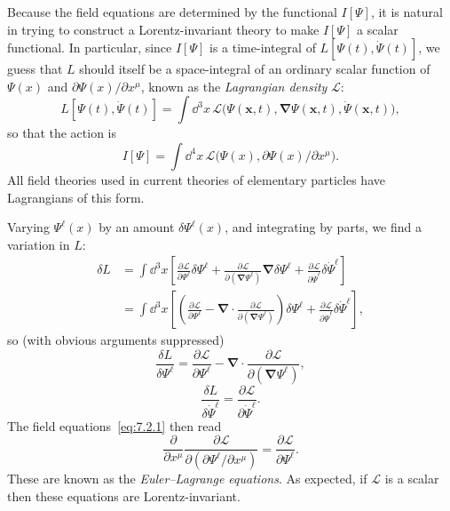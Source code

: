 Because the field equations are determined by the functional $I[\Psi]$,
it is natural in trying to construct a Lorentz-invariant theory to make
$I[\Psi]$ a scalar functional. In particular, since $I[\Psi]$ is a time-integral
of $L[\Psi(t),\dot\Psi(t)]$, we guess that $L$ should itself be a space-integral of an
ordinary scalar function of $\Psi(x)$ and $\partial\Psi(x)/\partial x^\mu$, known
as the \textit{Lagrangian density} $\mathcal{L}$:
\begin{equation}
L[\Psi(t),\dot\Psi(t)]=\int \dd^3x\,
\mathcal{L}\bigl(\Psi(\mathbf{x},t),\boldsymbol{\nabla}\Psi(\mathbf{x},t),
\dot\Psi(\mathbf{x},t)\bigr),
\tag{7.2.5}\label{eq:7.2.5}
\end{equation}
so that the action is
\begin{equation}
I[\Psi]=\int \dd^4x\,
\mathcal{L}\bigl(\Psi(x),\partial\Psi(x)/\partial x^\mu\bigr).
\tag{7.2.6}\label{eq:7.2.6}
\end{equation}
All field theories used in current theories of elementary particles have
Lagrangians of this form.

Varying $\Psi^\ell(x)$ by an amount $\delta\Psi^\ell(x)$, and integrating by parts,
we find a variation in $L$:
\begin{align*}
\delta L
&=\int \dd^3x\left[
\frac{\partial\mathcal{L}}{\partial\Psi^\ell}\delta\Psi^\ell
+\frac{\partial\mathcal{L}}{\partial(\boldsymbol{\nabla}\Psi^\ell)}
\boldsymbol{\nabla}\delta\Psi^\ell
+\frac{\partial\mathcal{L}}{\partial\dot\Psi^\ell}\delta\dot\Psi^\ell
\right]
\\
&=\int \dd^3x\left[
\left(\frac{\partial\mathcal{L}}{\partial\Psi^\ell}
-\boldsymbol{\nabla}\cdot
\frac{\partial\mathcal{L}}{\partial(\boldsymbol{\nabla}\Psi^\ell)}\right)
\delta\Psi^\ell
+\frac{\partial\mathcal{L}}{\partial\dot\Psi^\ell}\delta\dot\Psi^\ell
\right],
\end{align*}
so (with obvious arguments suppressed)
\begin{equation}
\frac{\delta L}{\delta\Psi^\ell}
=\frac{\partial\mathcal{L}}{\partial\Psi^\ell}
-\boldsymbol{\nabla}\cdot
\frac{\partial\mathcal{L}}{\partial(\boldsymbol{\nabla}\Psi^\ell)},
\tag{7.2.7}\label{eq:7.2.7}
\end{equation}
\begin{equation}
\frac{\delta L}{\delta\dot\Psi^\ell}
=\frac{\partial\mathcal{L}}{\partial\dot\Psi^\ell}.
\tag{7.2.8}\label{eq:7.2.8}
\end{equation}
The field equations~\eqref{eq:7.2.1} then read
\begin{equation}
\frac{\partial}{\partial x^\mu}
\frac{\partial\mathcal{L}}{\partial(\partial\Psi^\ell/\partial x^\mu)}
=\frac{\partial\mathcal{L}}{\partial\Psi^\ell}.
\tag{7.2.9}\label{eq:7.2.9}
\end{equation}
These are known as the \textit{Euler--Lagrange equations}. As expected, if
$\mathcal{L}$ is a scalar then these equations are Lorentz-invariant.

